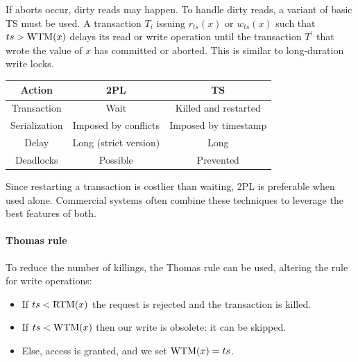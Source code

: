 If aborts occur, dirty reads may happen. 
To handle dirty reads, a variant of basic TS must be used. 
A transaction $T_i$ issuing $r_{ts}(x)$ or $w_{ts}(x)$ such that $ts>\textnormal{WTM}(x)$ delays its read or write operation until the transaction $T^{'}$ that wrote the value of $x$ has committed or aborted. 
This is similar to long-duration write locks.
\begin{table}[H]
    \centering
    \begin{tabular}{c|cc}
    \textbf{Action} & \textbf{2PL}          & \textbf{TS}          \\ \hline
    Transaction     & Wait                  & Killed and restarted \\
    Serialization   & Imposed by conflicts  & Imposed by timestamp \\
    Delay           & Long (strict version) & Long                 \\
    Deadlocks       & Possible              & Prevented           
    \end{tabular}
\end{table}
Since restarting a transaction is costlier than waiting, 2PL is preferable when used alone. 
Commercial systems often combine these techniques to leverage the best features of both. 

\paragraph*{Thomas rule}
To reduce the number of killings, the Thomas rule can be used, altering the rule for write operations:
\begin{itemize}
    \item If $ts<\textnormal{RTM}(x)$ the request is rejected and the transaction is killed. 
    \item If $ts<\textnormal{WTM}(x)$ then our write is obsolete: it can be skipped. 
    \item Else, access is granted, and we set $\textnormal{WTM}(x)=ts$. 
\end{itemize}

